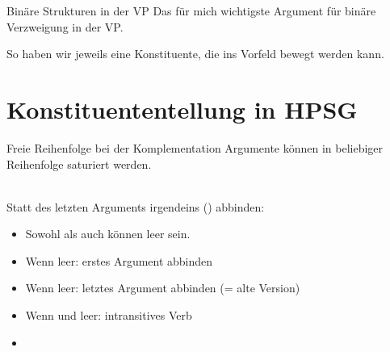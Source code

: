 \begin{frame}
  {Binäre Strukturen in der VP}
  \onslide<+->
  \onslide<+->
  Das für mich wichtigste Argument für binäre Verzweigung in der VP.\\
  \onslide<+->
  \Halbzeile
  \begin{exe}
    \Halbzeile
  \end{exe}
  \onslide<+->
  \Zeile
  So haben wir jeweils eine \alert{Konstituente}, die ins Vorfeld bewegt werden kann.
\end{frame}

\section{Konstituententellung in HPSG}

\begin{frame}
  {Freie Reihenfolge bei der Komplementation}
  \onslide<+->
  \onslide<+->
  Argumente können in beliebiger Reihenfolge saturiert werden.\\
  \onslide<+->
  \Zeile
  \centering 
  \\
  \onslide<+->
  \onslide<+->
  \Zeile
  \raggedright
  Statt des letzten Arguments irgendeins () abbinden:\\
  \Halbzeile
  \begin{itemize}[<+->]\footnotesize
    \item Sowohl  als auch  können leer sein.
    \item Wenn  leer: erstes Argument abbinden
    \item Wenn  leer: letztes Argument abbinden (= alte Version)
    \item Wenn  und  leer: intransitives Verb
    \item {}
  \end{itemize}
\end{frame}

